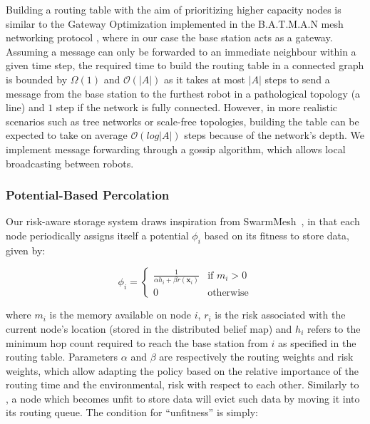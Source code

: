 \documentclass[runningheads]{llncs}
\begin{document}
Building a routing 
table with the aim of prioritizing higher capacity nodes is similar to the Gateway 
Optimization \cite{openMesh2021gateways} implemented in the B.A.T.M.A.N mesh networking 
protocol \cite{johnson2008simple}, where in our case the base station acts as a gateway.
Assuming a message can only be forwarded to an immediate neighbour within a given time 
step, the required time to build the routing table in a connected graph is bounded by 
$\Omega(1)$ and $\mathcal{O}(|A|)$ as it takes at most $|A|$ steps to send a message from 
the base station to the furthest robot in a pathological topology (a line) and $1$ step if 
the network is fully connected. However, in more realistic scenarios such as tree networks 
or scale-free topologies, building the table can be expected to take on average 
$\mathcal{O}(log|A|)$ steps because of the network's depth. We implement message forwarding through a gossip algorithm, which allows local broadcasting between robots.

\subsubsection{Potential-Based Percolation}
Our risk-aware storage system draws inspiration from 
SwarmMesh~\cite{majcherczykSwarmmesh2020}, in that each node periodically assigns
itself a potential $\phi_i$ based on its fitness to store data, given by:

\begin{equation}
        \phi_i =
        \left\{ 
        \begin{array}{ll}
            \frac{1}{\alpha h_i + \beta r({\bm{x}_i})} &\text{if } m_i > 0 \\
            0 &\text{otherwise}
        \end{array} \right.
        \label{equation:fitness}
\end{equation}

 where $m_i$ is the memory available on node $i$, $r_i$ is the risk
 associated with the current node's location (stored in the
 distributed belief map) and $h_i$ refers to the minimum hop count
 required to reach the base station from $i$ as specified in the
 routing table. Parameters $\alpha$ and $\beta$ are respectively the routing weights and 
 risk weights, which allow adapting the policy based on the relative importance of the 
 routing time and the environmental, risk with respect to each other. Similarly to 
 \cite{majcherczykSwarmmesh2020}, a node  which becomes unfit to store data will evict such 
 data by moving it into its routing queue. The condition for ``unfitness'' is simply:
\end{document}
